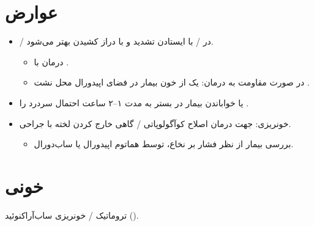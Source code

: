 \documentclass[a4paper,12pt]{extbook}
\begin{document}
\section*{عوارض }
\begin{itemize}
\item {} / در  / با ایستادن تشدید و با دراز کشیدن بهتر می‌شود.
  \begin{itemize}
  \item درمان با .
  \item در صورت مقاومت به درمان: یک  از خون بیمار در فضای اپیدورال محل نشت .
  \end{itemize}
\item {} یا خواباندن بیمار در بستر به مدت ۱–۲ ساعت احتمال سردرد را .
\item خونریزی: جهت درمان اصلاح کوآگولوپاتی / گاهی خارج کردن لخته با جراحی.
  \begin{itemize}
  \item بررسی بیمار از نظر فشار بر نخاع، توسط هماتوم اپیدورال یا ساب‌دورال.
  \end{itemize}
\end{itemize}
\section*{ خونی}
 تروماتیک / خونریزی ساب‌آراکنوئید ().

\end{document}
